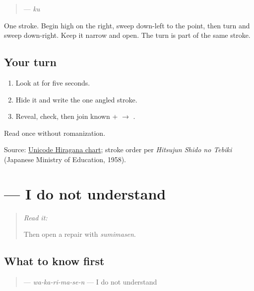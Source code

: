 \begin{quote}
\textbf{} — \emph{ku}
\end{quote}

One stroke. Begin high on the right, sweep down-left to the point, then turn and sweep down-right. Keep it narrow and open. The turn is part of the same stroke.

\subsection*{Your turn}
\begin{enumerate}
\raggedright
  \item Look at \textbf{} for five seconds.
  \item Hide it and write the one angled stroke.
  \item Reveal, check, then join known \textbf{} + \textbf{} $\to$ \textbf{}.
\end{enumerate}

\begin{tcolorbox}[breakable,colback=teal!4,colframe=teal!35!black,title={Before you move on}]
Read \textbf{} once without romanization.

Source: \href{https://www.unicode.org/charts/PDF/U3040.pdf}{Unicode Hiragana chart}; stroke order per \emph{Hitsujun Shido no Tebiki} (Japanese Ministry of Education, 1958).
\end{tcolorbox}
\section[\texorpdfstring{\ja{わかりません} (wakarimasen)}{わかりません (wakarimasen)}]{ — I do not understand}

\label{lesson:JA-C09-wakarimasen}



\begin{quote}
\emph{Read it:} \textbf{}

Then open a repair with \emph{sumimasen}.
\end{quote}

\subsection*{What to know first}
\begin{quote}
\textbf{} — \emph{wa-ka-ri-ma-se-n} — I do not understand
\end{quote}

